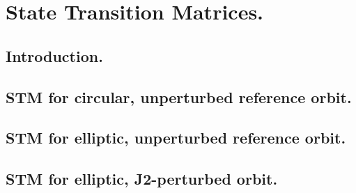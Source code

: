 \chapter{State Transition Matrices.}
%
\label{app: 	STMs}
%
\section{Introduction.}
%
%
\section{STM for circular, unperturbed reference orbit.}
%
%
\section{STM for elliptic, unperturbed reference orbit.}
%
%
\section{STM for elliptic, J2-perturbed orbit.}
%
%
